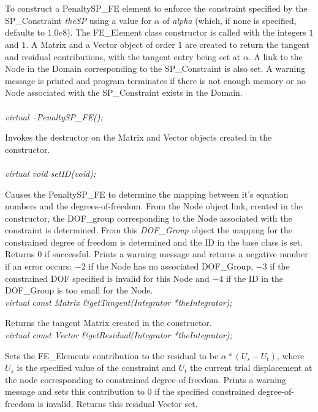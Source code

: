   \\
\\
To construct a PenaltySP\_FE element to enforce the constraint
specified by the SP\_Constraint {\em theSP} using a value for
$\alpha$ of {\em alpha} (which, if none is specified, defaults to
$1.0e8$). The FE\_Element class constructor is called with 
the integers $1$ and $1$. A Matrix and a Vector object of order $1$
are created to return the tangent and residual contributions, with the
tangent entry being set at $\alpha$. A link to the Node in the  Domain
corresponding to the SP\_Constraint is also set. A warning message is
printed and program terminates if there is not enough memory or no
Node associated with the SP\_Constraint exists in the Domain.\\

  \\
{\em virtual~ $\tilde{}$PenaltySP\_FE();}  

Invokes the destructor on the Matrix and Vector objects created in the
constructor. \\

  \\
{\em virtual void setID(void);} 

Causes the PenaltySP\_FE to determine the mapping between it's equation
numbers and the degrees-of-freedom. From the Node object link, created
in the constructor, the DOF\_group corresponding to the Node
associated with the constraint is determined. From this {\em
DOF\_Group} object the mapping for the constrained degree of freedom
is determined and the ID in the base class is set. Returns $0$ if
successful. Prints a warning message and returns a negative number if
an error occurs: $-2$ if the
Node has no associated DOF\_Group, $-3$ if the constrained DOF
specified is invalid for this Node and $-4$ if the ID in the
DOF\_Group is too small for the Node. \\ 

{\em virtual const Matrix \&getTangent(Integrator *theIntegrator);} 

Returns the tangent Matrix created in the constructor. \\

{\em virtual const Vector \&getResidual(Integrator *theIntegrator);} 

Sets the FE\_Elements contribution to the residual to be
$\alpha * (U_s - U_t)$, where $U_s$ is the specified value of the
constraint and $U_t$ the current trial displacement at the node
corresponding to constrained degree-of-freedom. Prints a warning
message and sets this contribution to $0$ if the specified constrained
degree-of-freedom is invalid. Returns this residual Vector set.


